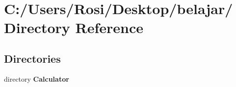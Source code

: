 \section{C:/Users/Rosi/Desktop/belajar/ Directory Reference}
\label{dir_C_3A_2FUsers_2FRosi_2FDesktop_2Fbelajar_2F}


\subsection*{Directories}
\begin{CompactItemize}
\item 
directory {\bf Calculator}
\end{CompactItemize}

